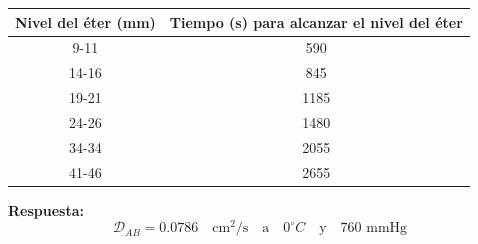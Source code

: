 \begin{table}[h]
    \centering
    \begin{tabular}{cc} %
        \toprule
        Nivel del éter (mm) & Tiempo (s) para alcanzar el nivel del éter \\
        \midrule
        9-11  & 590  \\
        14-16 & 845  \\
        19-21 & 1185 \\
        24-26 & 1480 \\
        34-34 & 2055 \\
        41-46 & 2655 \\
        \bottomrule
    \end{tabular}
\end{table}

\textbf{Respuesta:} \[
\mathscr{D}_{AB} = 0.0786 \quad \text{cm}^2/\text{s} \quad \text{a} \quad 0^\circ C \quad \text{y} \quad 760 \text{ mmHg}
\]
\newpage
